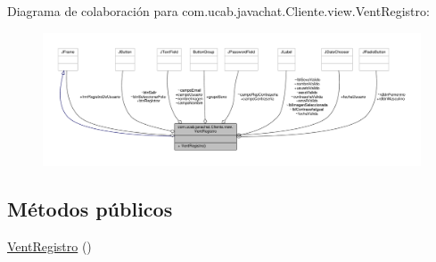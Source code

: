 Diagrama de colaboración para com.\-ucab.\-javachat.\-Cliente.\-view.\-Vent\-Registro\-:
\nopagebreak
\begin{figure}[H]
\begin{center}
\leavevmode
\includegraphics[width=350pt]{dd/dbf/classcom_1_1ucab_1_1javachat_1_1_cliente_1_1view_1_1_vent_registro__coll__graph}
\end{center}
\end{figure}
\subsection*{Métodos públicos}
\begin{DoxyCompactItemize}
\item 
\hyperlink{classcom_1_1ucab_1_1javachat_1_1_cliente_1_1view_1_1_vent_registro_afa090a64f6a6a83f682702abc3cf1fa2}{Vent\-Registro} ()
\end{DoxyCompactItemize}

